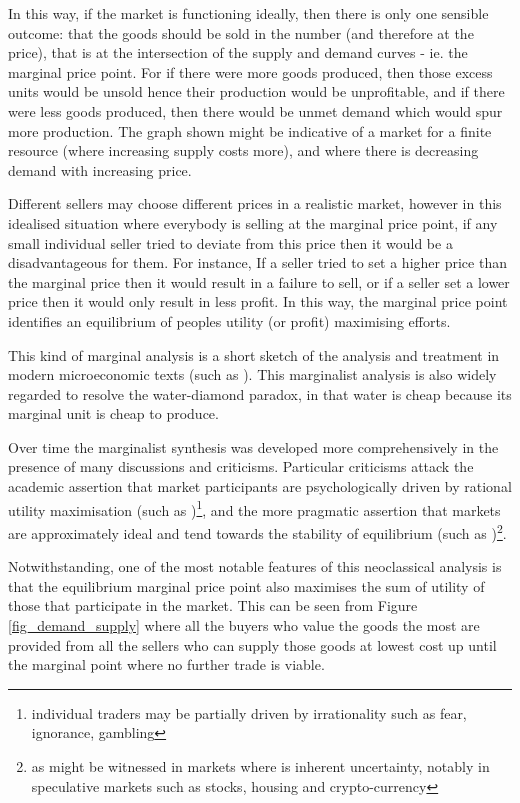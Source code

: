 In this way, if the market is functioning ideally, then there is only one sensible outcome: that the goods should be sold in the number (and therefore at the price), that is at the intersection of the supply and demand curves - ie. the marginal price point.
For if there were more goods produced, then those excess units would be unsold hence their production would be unprofitable, and if there were less goods produced, then there would be unmet demand which would spur more production.
The graph shown might be indicative of a market for a finite resource (where increasing supply costs more), and where there is decreasing demand with increasing price.

Different sellers may choose different prices in a realistic market, however in this idealised situation where everybody is selling at the marginal price point, if any small individual seller tried to deviate from this price then it would be a disadvantageous for them.
For instance, If a seller tried to set a higher price than the marginal price then it would result in a failure to sell, or if a seller set a lower price then it would only result in less profit.
In this way, the marginal price point identifies an equilibrium of peoples utility (or profit) maximising efforts.

This kind of marginal analysis is a short sketch of the analysis and treatment in modern microeconomic texts (such as \cite{vohra_2020}).
This marginalist analysis is also widely regarded to resolve the water-diamond paradox, in that water is cheap because its marginal unit is cheap to produce.

Over time the marginalist synthesis was developed more comprehensively in the presence of many discussions and criticisms.
Particular criticisms attack the academic assertion that market participants are psychologically driven by rational utility maximisation (such as \cite{RePEc:ucp:jpolec:v:58:y:1950:p:307})\footnote{individual traders may be partially driven by irrationality such as fear, ignorance, gambling}, and the more pragmatic assertion that markets are approximately ideal and tend towards the stability of equilibrium (such as \cite{nla.cat-vn5739105})\footnote{as might be \DIFaddbegin {}\DIFaddend witnessed in markets where is inherent uncertainty, notably in speculative markets such as stocks, housing and crypto-currency}.



Notwithstanding, one of the most notable features of this neoclassical analysis is that the equilibrium marginal price point also maximises the sum of utility of those that participate in the market.
This can be seen from Figure \ref{fig_demand_supply} where all the buyers who value the goods the most are provided from all the sellers who can supply those goods at lowest cost up until the marginal point where no further trade is viable.

